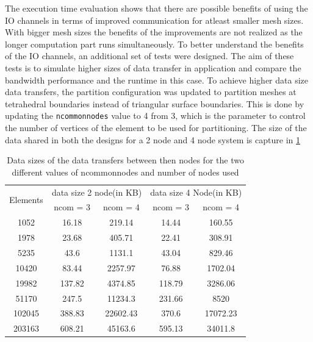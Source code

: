 The execution time evaluation shows that there are possible benefits of using the IO channels
in terms of improved communication for atleast smaller mesh sizes. With bigger mesh sizes
the benefits of the improvements are not realized as the longer computation part runs
simultaneously. To better understand the benefits of the IO channels, an additional set of
tests were designed. The aim of these tests is to simulate higher sizes of data transfer
in application and compare the bandwidth performance and the runtime in this case.
To achieve higher data size data transfers, the partition configuration was updated to
partition meshes at tetrahedral boundaries instead of triangular surface boundaries.
This is done by updating the \texttt{ncommonnodes} value to 4 from 3, which is the parameter
to control the number of vertices of the element to be used for partitioning. The
size of the data shared in both the designs for a 2 node and 4 node system is
capture in \ref{tab:sizes_var}
\begin{table}[ht]
    \centering
    \caption{Data sizes of the data transfers between then nodes for the two different values of ncommonnodes and number of nodes used}
    \label{tab:sizes_var}
    \begin{tabular}{|ccccc|}
    \hline
    \multirow{2}{*}{Elements} & \multicolumn{2}{c|}{data size 2 node(in KB)} & \multicolumn{2}{c|}{data size 4 Node(in KB)} \\ \cline{2-5}
     & ncom = 3 & ncom = 4 & ncom = 3 & ncom = 4 \\ \hline
    1052 & 16.18 & 219.14 & 14.44 & 160.55 \\ \hline
    1978 & 23.68 & 405.71 & 22.41 & 308.91 \\ \hline
    5235 & 43.6 & 1131.1 & 43.04 & 829.46 \\ \hline
    10420 & 83.44 & 2257.97 & 76.88 & 1702.04 \\ \hline
    19982 & 137.82 & 4374.85 & 118.79 & 3286.06 \\ \hline
    51170 & 247.5 & 11234.3 & 231.66 & 8520 \\ \hline
    102045 & 388.83 & 22602.43 & 370.6 & 17072.23 \\ \hline
    203163 & 608.21 & 45163.6 & 595.13 & 34011.8 \\ \hline
    \end{tabular}%
\end{table}

